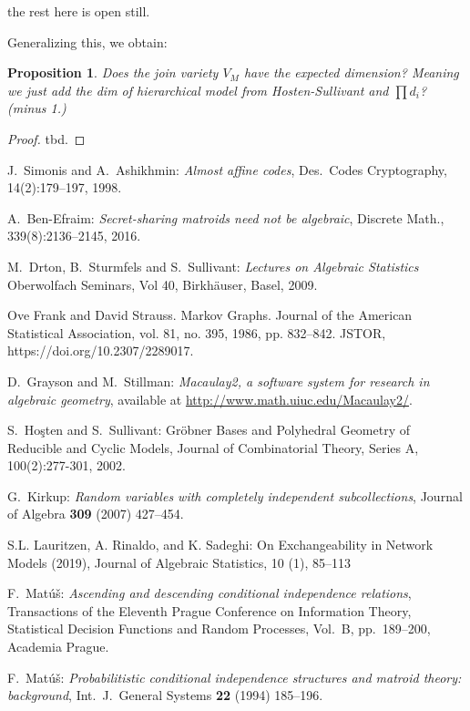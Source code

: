 \documentclass[12pt]{extarticle}
\newtheorem{proposition}[theorem]{Proposition}
\theoremstyle{definition}
\numberwithin{theorem}{section}
\begin{document}
{\color{magenta}the rest here is open still.} 

Generalizing this, we obtain: 
\begin{proposition}
	Does the join variety $V_M$ have the expected dimension? Meaning we just add the dim of  hierarchical model from Hosten-Sullivant and $\prod d_i$? (minus 1.) 
\end{proposition}
\begin{proof}
	tbd.
\end{proof} 




\begin{thebibliography}{10}

J.~Simonis and A.~Ashikhmin: {\em Almost affine codes},
Des.~Codes Cryptography, 14(2):179--197, 1998.

A.~Ben-Efraim: {\em Secret-sharing matroids need not be algebraic},
Discrete Math., 339(8):2136--2145, 2016.

M.~Drton, B.~Sturmfels and S.~Sullivant: {\em Lectures on Algebraic Statistics}
Oberwolfach Seminars, Vol 40, Birkh\"auser, Basel, 2009.

Ove Frank and David Strauss. Markov Graphs. Journal of the American Statistical Association, vol. 81, no. 395, 1986, pp. 832--842. JSTOR, https://doi.org/10.2307/2289017. 

D.~Grayson and M.~Stillman:
{\em Macaulay2, a software system for research in algebraic geometry},
available at \url{http://www.math.uiuc.edu/Macaulay2/}.

S.~Ho\c{s}ten and S.~Sullivant: 
Gr\"obner Bases and Polyhedral Geometry of Reducible and Cyclic Models,
Journal of Combinatorial Theory, Series A,  100(2):277-301, 2002. 

G.~Kirkup: {\em Random variables with completely independent subcollections},
Journal of Algebra {\bf 309} (2007) 427--454.

S.L. Lauritzen, A. Rinaldo, and K. Sadeghi:
On Exchangeability in Network Models (2019), 
Journal of Algebraic Statistics, 10 (1), 85--113

F.~Mat\'u\v{s}: {\em Ascending and descending conditional independence relations},
Transactions of the Eleventh Prague Conference on Information Theory, Statistical Decision Functions and Random Processes,
Vol.~B, pp.~189--200, Academia Prague.

F.~Mat\'u\v{s}: {\em Probabilitistic conditional independence structures and matroid
theory: background}, Int.~J.~General Systems {\bf 22} (1994) 185--196.


\end{thebibliography}
\end{document}

